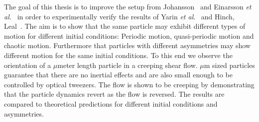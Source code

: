 The goal of this thesis is to improve the setup from Johansson~\cite{AntonThesis} and Einarsson \emph{et al.}~\cite{JonasExperiment} in order to experimentally verify the results of Yarin \emph{et al}.~\cite{Yarin} and Hinch, Leal~\cite{Leal}. The aim is to show that the same particle may exhibit different types of motion for different initial conditions: Periodic motion, quasi-periodic motion and chaotic motion. Furthermore that particles with different asymmetries may show different motion for the same initial conditions. To this end we observe the orientation of a $\mu$meter length particle in a creeping shear flow. $\mu$m sized particles guarantee that there are no inertial effects and are also small enough to be controlled by optical tweezers. The flow is shown to be creeping by demonstrating that the particle dynamics revert as the flow is reversed. The results are compared to theoretical predictions for different initial conditions and asymmetries.

